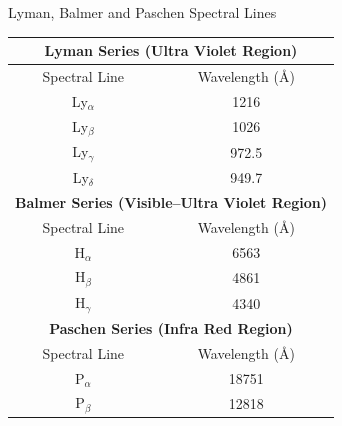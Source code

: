 \documentclass[xcolor=dvipsnames,t]{beamer}
\begin{document}
    \begin{frame}{Lyman, Balmer and Paschen Spectral Lines} 


     \begin{table}
        \centering
        \centering
        \begin{tabular}{cc} \hline 
            \multicolumn{2}{c}{\bf Lyman Series (Ultra Violet Region)} \\ \hline 
            Spectral Line & Wavelength (\AA) \\ \hline 
            Ly$_{\alpha}$     &   1216    \\ 
            Ly$_{\beta}$      &   1026    \\ 
            Ly$_{\gamma}$     &   972.5   \\
            Ly$_{\delta}$    &   949.7   \\ \hline 

            \multicolumn{2}{c}{\bf Balmer Series (Visible--Ultra Violet Region)} \\ \hline 
            Spectral Line & Wavelength (\AA) \\ \hline 
            H$_{\alpha}$     &   6563    \\ 
            H$_{\beta}$      &   4861    \\ 
            H$_{\gamma}$     &   4340   \\ \hline 

            \multicolumn{2}{c}{\bf Paschen Series (Infra Red Region)} \\ \hline 
            Spectral Line & Wavelength (\AA) \\ \hline 
            P$_{\alpha}$     &   18751    \\ 
            P$_{\beta}$      &   12818    \\  \hline

        \end{tabular}
    \end{table} 
    \end{frame} 

\end{document}
